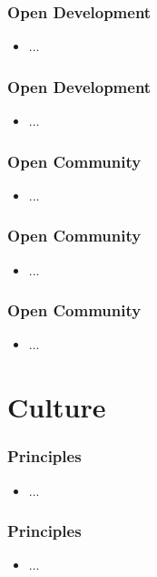 \documentclass[aspectratio=169,11pt,hyperref={colorlinks=true}]{beamer}
\begin{document}
\begin{frame}
  \frametitle{Open Development}
    \begin{itemize}
        \item{...}
    \end{itemize}
\end{frame}

\begin{frame}
  \frametitle{Open Development}
    \begin{itemize}
        \item{...}
    \end{itemize}
\end{frame}

\begin{frame}
  \frametitle{Open Community}
    \begin{itemize}
        \item{...}
    \end{itemize}
\end{frame}

\begin{frame}
  \frametitle{Open Community}
    \begin{itemize}
        \item{...}
    \end{itemize}
\end{frame}

\begin{frame}
  \frametitle{Open Community}
    \begin{itemize}
        \item{...}
    \end{itemize}
\end{frame}

\section{Culture}

\begin{frame}
  \frametitle{Principles}
    \begin{itemize}
        \item{...}
    \end{itemize}
\end{frame}

\begin{frame}
  \frametitle{Principles}
    \begin{itemize}
        \item{...}
    \end{itemize}
\end{frame}
\end{document}

